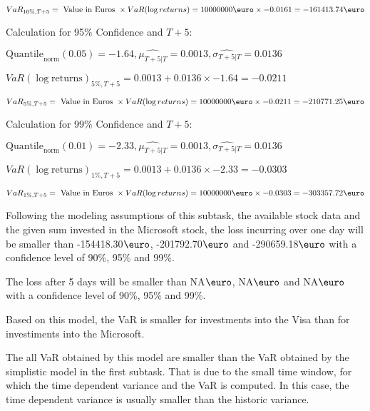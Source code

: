 \indent\indent $VaR_{10\%, T + 5} = \text{ Value in Euros } \times VaR(\log returns) = 10 000 000 \text{\euro} \times-0.0161 = -161413.74 \text{\euro}$\newline




Calculation for 95\% Confidence and $T+5$:

\indent\indent $\text{Quantile}_\text{norm}(0.05) = -1.64,\hat{\mu_{T+5|T}} = 0.0013, \hat{\sigma_{T+5|T}} = 0.0136$

\indent\indent $VaR(\log \text{returns})_{5\%, T + 5} = 0.0013 + 0.0136\times-1.64 = -0.0211$

\indent\indent $VaR_{5\%, T + 5} = \text{ Value in Euros } \times VaR(\log returns) = 10 000 000 \text{\euro} \times-0.0211 = -210771.25 \text{\euro}$\newline




Calculation for 99\% Confidence and $T+5$:

\indent\indent $\text{Quantile}_\text{norm}(0.01) = -2.33,\hat{\mu_{T+5|T}} = 0.0013, \hat{\sigma_{T+5|T}} = 0.0136$

\indent\indent $VaR(\log \text{returns})_{1\%, T + 5} = 0.0013 + 0.0136\times-2.33 = -0.0303$

\indent\indent $VaR_{1\%, T + 5} = \text{ Value in Euros } \times VaR(\log returns) = 10 000 000 \text{\euro} \times-0.0303 = -303357.72 \text{\euro}$\newline


Following the modeling assumptions of this subtask, the available stock data and the given sum invested in the Microsoft stock, the loss incurring over one day will be smaller than -154418.30$\text{\euro}$, -201792.70$\text{\euro}$  and -290659.18$\text{\euro}$  with a confidence level of 90\%, 95\%  and 99\%.

The loss after 5 days will be smaller than NA$\text{\euro}$, NA$\text{\euro}$  and NA$\text{\euro}$  with a confidence level of 90\%, 95\%  and 99\%.

Based on this model, the VaR is smaller for investments into the Visa than for investiments into the Microsoft.

The all VaR obtained by this model are smaller than the VaR obtained by the simplistic model in the first subtask. That is due to the small time window, for which the time dependent variance and the VaR is computed. In this case, the time dependent variance is usually smaller than the historic variance.


